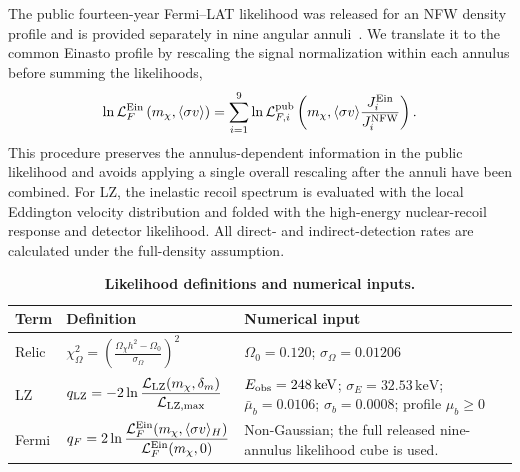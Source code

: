 \documentclass[%
  aps,
  prl,
  reprint,
  superscriptaddress,
  amsmath,
  amssymb,
  longbibliography
]{revtex4-2}
\begin{document}
The public fourteen-year Fermi--LAT likelihood was released for an NFW density profile and is provided separately in nine angular annuli~\cite{Dessert:2022evk}. We translate it to the common Einasto profile by rescaling the signal normalization within each annulus before summing the likelihoods,
\begin{equation}
\ln \mathcal{L}^{\rm Ein}_F
\left(m_\chi,\langle\sigma v\rangle\right)
=
\sum_{i=1}^{9}
\ln \mathcal{L}^{\rm pub}_{F,i}
\left(
m_\chi,
\langle\sigma v\rangle
\frac{J_i^{\rm Ein}}{J_i^{\rm NFW}}
\right).
\label{eq:fermi_einasto_reweight}
\end{equation}
This procedure preserves the annulus-dependent information in the public likelihood and avoids applying a single overall rescaling after the annuli have been combined. For LZ, the inelastic recoil spectrum is evaluated with the local Eddington velocity distribution and folded with the high-energy nuclear-recoil response and detector likelihood. All direct- and indirect-detection rates are calculated under the full-density assumption.

\begin{table}[tbp]
\caption{\textbf{Likelihood definitions and numerical inputs.} }
\label{tab:likelihood-contract}
\footnotesize
\begin{ruledtabular}
\begin{tabular}{@{}p{}p{}p{}@{}}
{\raggedright Term\par} &
{\raggedright Definition\par} &
{\raggedright Numerical input\par}\\
\hline
{\raggedright Relic\par} &
{\raggedright $\displaystyle
\chi_\Omega^2=\left(\frac{\Omega_\chi h^2-\Omega_0}{\sigma_\Omega}\right)^2$
\par} &
{\raggedright $\Omega_0=0.120$;
$\sigma_\Omega=0.01206$\par}\\[1.0ex]

{\raggedright LZ\par} &
{\raggedright $\displaystyle q_{\rm LZ}=-2\ln
\frac{{\cal L}_{\rm LZ}(m_\chi,\delta_m)}{{\cal L}_{\rm LZ,max}}$\par} &
{\raggedright $E_{\rm obs}=248\,\mathrm{keV}$;
$\sigma_E=32.53\,\mathrm{keV}$;
$\bar\mu_b=0.0106$;
$\sigma_b=0.0008$;
profile $\mu_b\geq0$\par}\\[1.0ex]

{\raggedright Fermi\par} &
{\raggedright $\displaystyle q_F=2\ln
\frac{{\cal L}^{\rm Ein}_F(m_\chi,\langle\sigma v\rangle_H)}
{{\cal L}^{\rm Ein}_F(m_\chi,0)}$\par} &
{\raggedright Non-Gaussian; the full released nine-annulus likelihood cube is
used.\par}\\
\end{tabular}
\end{ruledtabular}
\end{table}
\end{document}
